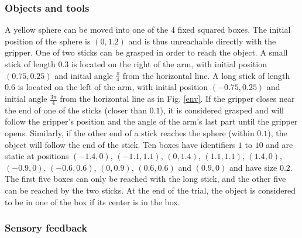 \documentclass[10pt,letterpaper]{article}
\begin{document}
			
		\subsubsection{Objects and tools}
			
			A yellow sphere can be moved into one of the 4 fixed squared boxes. 
			The initial position of the sphere is $(0, 1.2)$ and is thus unreachable directly with the gripper.
			One of two sticks can be grasped in order to reach the object.
			A small stick of length $0.3$ is located on the right of the arm, with initial position $(0.75, 0.25)$ and initial angle $\frac{\pi}{4}$ from the horizontal line.
			A long stick of length $0.6$ is located on the left of the arm, with initial position $(-0.75, 0.25)$ and initial angle $\frac{3\pi}{4}$ from the horizontal line as in Fig. \ref{env}.			
			If the gripper closes near the end of one of the sticks (closer than $0.1$), it is considered grasped and will follow the gripper's position and the angle of the arm's last part until the gripper opens.			
			Similarly, if the other end of a stick reaches the sphere (within $0.1$), the object will follow the end of the stick.
			Ten boxes have identifiers $1$ to $10$ and are static at positions $(-1.4, 0)$, $(-1.1, 1.1)$, $(0, 1.4)$, $(1.1, 1.1)$, $(1.4, 0)$, $(-0.9, 0)$, $(-0.6, 0.6)$, $(0, 0.9)$, $(0.6, 0.6)$ and $(0.9, 0)$ and have size $0.2$.
			The first five boxes can only be reached with the long stick, and the other five can be reached by the two sticks.
			At the end of the trial, the object is considered to be in one of the box if its center is in the box.\\
		
		
		\subsubsection{Sensory feedback}
		
\end{document}
